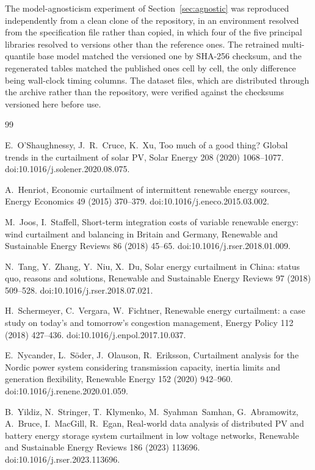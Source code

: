\documentclass[preprint,3p,times]{elsarticle}
\begin{document}
The model-agnosticism experiment of Section~\ref{sec:agnostic} was reproduced independently from a clean clone of the repository, in an environment resolved from the specification file rather than copied, in which four of the five principal libraries resolved to versions other than the reference ones. The retrained multi-quantile base model matched the versioned one by SHA-256 checksum, and the regenerated tables matched the published ones cell by cell, the only difference being wall-clock timing columns. The dataset files, which are distributed through the archive rather than the repository, were verified against the checksums versioned here before use.

\begin{thebibliography}{99}

E.~O'Shaughnessy, J.~R.~Cruce, K.~Xu,
Too much of a good thing? Global trends in the curtailment of solar PV,
Solar Energy 208 (2020) 1068--1077.
doi:10.1016/j.solener.2020.08.075.

A.~Henriot,
Economic curtailment of intermittent renewable energy sources,
Energy Economics 49 (2015) 370--379.
doi:10.1016/j.eneco.2015.03.002.

M.~Joos, I.~Staffell,
Short-term integration costs of variable renewable energy: wind curtailment and balancing in Britain and Germany,
Renewable and Sustainable Energy Reviews 86 (2018) 45--65.
doi:10.1016/j.rser.2018.01.009.

N.~Tang, Y.~Zhang, Y.~Niu, X.~Du,
Solar energy curtailment in China: status quo, reasons and solutions,
Renewable and Sustainable Energy Reviews 97 (2018) 509--528.
doi:10.1016/j.rser.2018.07.021.

H.~Schermeyer, C.~Vergara, W.~Fichtner,
Renewable energy curtailment: a case study on today's and tomorrow's congestion management,
Energy Policy 112 (2018) 427--436.
doi:10.1016/j.enpol.2017.10.037.

E.~Nycander, L.~S\"oder, J.~Olauson, R.~Eriksson,
Curtailment analysis for the Nordic power system considering transmission capacity, inertia limits and generation flexibility,
Renewable Energy 152 (2020) 942--960.
doi:10.1016/j.renene.2020.01.059.

B.~Yildiz, N.~Stringer, T.~Klymenko, M.~Syahman~Samhan, G.~Abramowitz, A.~Bruce, I.~MacGill, R.~Egan,
Real-world data analysis of distributed PV and battery energy storage system curtailment in low voltage networks,
Renewable and Sustainable Energy Reviews 186 (2023) 113696.
doi:10.1016/j.rser.2023.113696.


\end{thebibliography}
\end{document}
